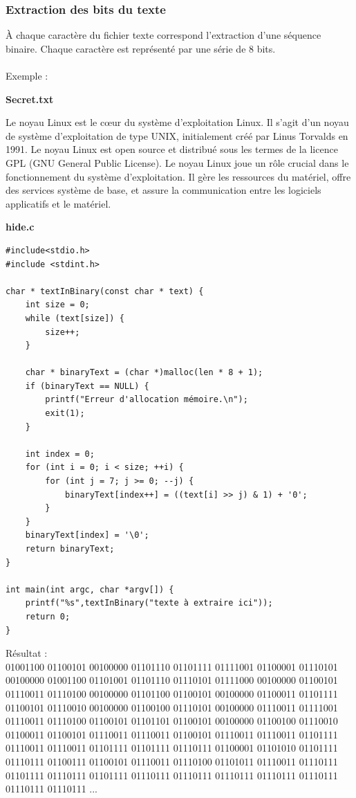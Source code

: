\documentclass{article}
\begin{document}
\subsubsection{Extraction des bits du texte}
À chaque caractère du fichier texte correspond l'extraction d'une séquence binaire. Chaque caractère est représenté par une série de 8 bits.\\\\
Exemple :
\begin{center}
    \textbf{Secret.txt}
\end{center}
\begin{framed}
Le noyau Linux est le cœur du système d'exploitation Linux. Il s'agit d'un noyau de système d'exploitation de type UNIX, initialement créé par Linus Torvalds en 1991. Le noyau Linux est open source et distribué sous les termes de la licence GPL (GNU General Public License).
Le noyau Linux joue un rôle crucial dans le fonctionnement du système d'exploitation. Il gère les ressources du matériel, offre des services système de base, et assure la communication entre les logiciels applicatifs et le matériel.
\end{framed}
\newpage
\begin{center}
    \textbf{hide.c}
\end{center}
\begin{framed}
\begin{verbatim}
#include<stdio.h>
#include <stdint.h>

char * textInBinary(const char * text) {
    int size = 0;
    while (text[size]) {
        size++;
    }

    char * binaryText = (char *)malloc(len * 8 + 1);
    if (binaryText == NULL) {
        printf("Erreur d'allocation mémoire.\n");
        exit(1);
    }

    int index = 0;
    for (int i = 0; i < size; ++i) {
        for (int j = 7; j >= 0; --j) {
            binaryText[index++] = ((text[i] >> j) & 1) + '0';
        }
    }
    binaryText[index] = '\0';
    return binaryText;
}

int main(int argc, char *argv[]) {
    printf("%s",textInBinary("texte à extraire ici"));
    return 0;
}
\end{verbatim}
\end{framed}

Résultat :\\01001100 01100101 00100000 01101110 01101111 01111001 01100001 01110101 00100000 01001100 01101001 01101110 01110101 01111000 00100000 01100101 01110011 01110100 00100000 01101100 01100101 00100000 01100011  01101111 01100101 01110010 00100000 01100100 01110101 00100000 01110011 01111001 01110011 01110100 01100101 01101101 01100101 00100000 01100100  01110010 01100011 01100101 01110011 01110011 01100101 01110011 01110011 01101111 01110011 01110011 01101111 01101111 01110111 01100001 01101010 01101111 01110111 01100111 01100101 01110011 01110100 01101011 01110011 01110111 01101111 01110111 01101111 01110111 01110111 01110111 01110111 01110111 01110111 01110111 ...\\
\end{document}
